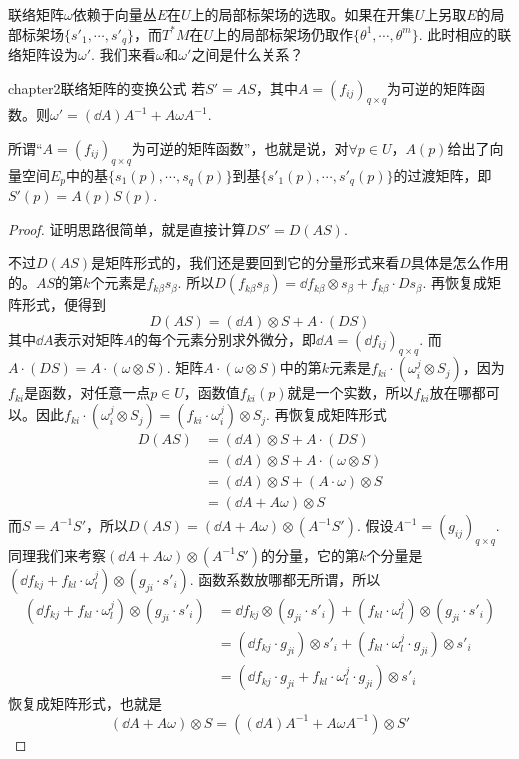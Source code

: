 联络矩阵$\omega$依赖于向量丛$E$在$U$上的局部标架场的选取。如果在开集$U$上另取$E$的局部标架场$\{s'_{1},\cdots,s'_{q} \}$，而$T^{\ast}M$在$U$上的局部标架场仍取作$\{\theta^{1},\cdots,\theta^{m} \}$. 此时相应的联络矩阵设为$\omega'$. 我们来看$\omega$和$\omega'$之间是什么关系？
\begin{mythm}{}{chapter2联络矩阵的变换公式}
	若$S'=A  S$，其中$A=(f_{ij})_{q\times q }$为可逆的矩阵函数。则$\omega'=(\dd A)  A^{-1}+A  \omega  A^{-1} $.
\end{mythm}
所谓“$A=(f_{ij})_{q\times q }$为可逆的矩阵函数”，也就是说，对$\forall p\in U$，$A(p)$给出了向量空间$E_{p}$中的基$\{s_{1}(p),\cdots,s_{q}(p) \}$到基$\{s'_{1}(p),\cdots,s'_{q}(p) \}$的过渡矩阵，即$S'(p)=A(p)S(p)$. 
\begin{proof}
	证明思路很简单，就是直接计算$DS'=D(A S)$. 
	
	不过$D(AS)$是矩阵形式的，我们还是要回到它的分量形式来看$D$具体是怎么作用的。$A  S$的第$k$个元素是$f_{k\beta}s_{\beta}$. 所以$D(f_{k\beta}s_{\beta})=\dd f_{k\beta}\otimes s_{\beta}+f_{k\beta}\cdot Ds_{\beta}$. 再恢复成矩阵形式，便得到
	\[D(A  S)=(\dd A)\otimes S+A\cdot (DS)\]
	其中$\dd A$表示对矩阵$A$的每个元素分别求外微分，即$\dd A=(\dd f_{ij})_{q\times q }$. 而$A\cdot (DS)=A\cdot (\omega\otimes S)$. 矩阵$A\cdot (\omega\otimes S)$中的第$k$元素是$f_{ki}\cdot (\omega^{j}_{i}\otimes S_{j})$，因为$f_{ki}$是函数，对任意一点$p\in U$，函数值$f_{ki}(p)$就是一个实数，所以$f_{ki}$放在哪都可以。因此$f_{ki}\cdot (\omega^{j}_{i}\otimes S_{j})=(f_{ki}\cdot \omega^{j}_{i})\otimes S_{j}$. 再恢复成矩阵形式
	\[
	\begin{split}
	D(AS)&=(\dd A)\otimes S+A\cdot (DS)\\
	&=(\dd A)\otimes S+A\cdot (\omega\otimes S)\\
	&=(\dd A)\otimes S+(A\cdot \omega)\otimes S\\
	&=(\dd A+A  \omega )\otimes S
	\end{split}
	\]
	而$S=A^{-1}  S'$，所以$D(AS)=(\dd A+A  \omega )\otimes (A^{-1}  S')$. 假设$A^{-1}=(g_{ij})_{q\times q}$. 同理我们来考察$(\dd A+A \omega )\otimes (A^{-1}  S')$的分量，它的第$k$个分量是$(\dd f_{kj}+f_{kl}\cdot \omega^{j}_{l})\otimes (g_{ji}\cdot s'_{i})$. 函数系数放哪都无所谓，所以
	\[
	\begin{split}
	(\dd f_{kj}+f_{kl}\cdot \omega^{j}_{l})\otimes (g_{ji}\cdot s'_{i})&=\dd f_{kj}\otimes  (g_{ji}\cdot s'_{i})+(f_{kl}\cdot \omega^{j}_{l})\otimes (g_{ji}\cdot s'_{i})\\
	&=(\dd f_{kj}\cdot g_{ji})  \otimes s'_{i}+(f_{kl}\cdot \omega^{j}_{l}\cdot g_{ji})\otimes s'_{i}\\
	&=(\dd f_{kj}\cdot g_{ji}+f_{kl}\cdot \omega^{j}_{l}\cdot g_{ji})\otimes s'_{i}
	\end{split}
	\]
	恢复成矩阵形式，也就是
	\[
	(\dd A+A  \omega )\otimes S=\left((\dd A)  A^{-1}+A   \omega  A^{-1} \right)\otimes S'
	\]
	

\end{proof}
